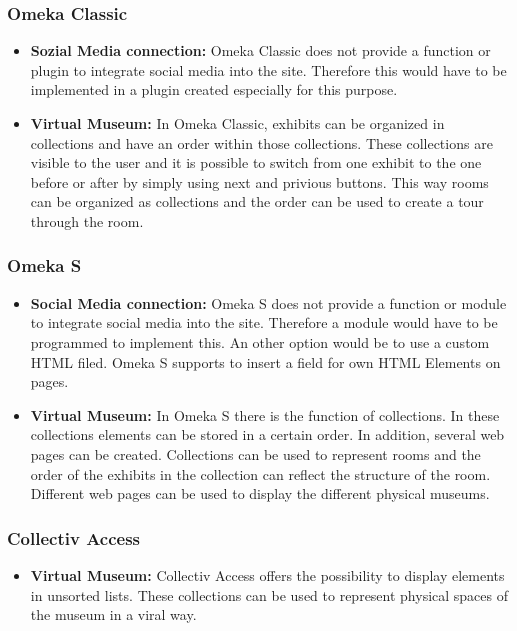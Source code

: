 \subsubsection{Omeka Classic}
\begin{itemize}
\item \textbf{Sozial Media connection:} Omeka Classic does not provide a function or plugin to integrate social media into the site. Therefore this would have to be implemented in a plugin created especially for this purpose.
\item \textbf{Virtual Museum:} In Omeka Classic, exhibits can be organized in collections and have an order within those collections. These collections are visible to the user and it is possible to switch from one exhibit to the one before or after by simply using next and privious buttons. This way rooms can be organized as collections and the order can be used to create a tour through the room.
\end{itemize}

\subsubsection{Omeka S}
\begin{itemize}
    \item \textbf{Social Media connection:} Omeka S does not provide a function or module to integrate social media into the site. Therefore a module would have to be programmed to implement this. An other option would be to use a custom HTML filed. Omeka S supports to insert a field for own HTML Elements on pages.
    \item \textbf{Virtual Museum:} In Omeka S there is the function of collections. In these collections elements can be stored in a certain order. In addition, several web pages can be created. Collections can be used to represent rooms and the order of the exhibits in the collection can reflect the structure of the room. Different web pages can be used to display the different physical museums.
\end{itemize}

\subsubsection{Collectiv Access}
\begin{itemize}
    \item \textbf{Virtual Museum:} Collectiv Access offers the possibility to display elements in unsorted lists. These collections can be used to represent physical spaces of the museum in a viral way.
\end{itemize}

